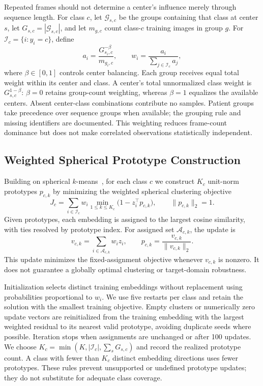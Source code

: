 Repeated frames should not determine a center's influence merely through sequence length. For class $c$, let $\mathcal{G}_{s,c}$ be the groups containing that class at center $s$, let $G_{s,c}=|\mathcal{G}_{s,c}|$, and let $m_{g,c}$ count class-$c$ training images in group $g$. For $\mathcal{I}_c=\{i:y_i=c\}$, define
\begin{equation}
    a_i=\frac{G_{s_i,c}^{-\beta}}{m_{g_i,c}},
    \qquad
    w_i=\frac{a_i}{\sum_{j\in\mathcal{I}_c}a_j},
    \label{eq:cbmp_weights}
\end{equation}
where $\beta\in[0,1]$ controls center balancing. Each group receives equal total weight within its center and class. A center's total unnormalized class weight is $G_{s,c}^{1-\beta}$: $\beta=0$ retains group-count weighting, whereas $\beta=1$ equalizes the available centers. Absent center-class combinations contribute no samples. Patient groups take precedence over sequence groups when available; the grouping rule and missing identifiers are documented. This weighting reduces frame-count dominance but does not make correlated observations statistically independent.

\subsection{Weighted Spherical Prototype Construction}
Building on spherical $k$-means~\cite{dhillon2001spherical}, for each class $c$ we construct $K_c$ unit-norm prototypes $p_{c,k}$ by minimizing the weighted spherical clustering objective
\begin{equation}
    J_c=\sum_{i\in\mathcal{I}_c}w_i
    \min_{1\leq k\leq K_c}\bigl(1-z_i^\top p_{c,k}\bigr),
    \qquad \|p_{c,k}\|_2=1.
    \label{eq:cbmp_clustering}
\end{equation}
Given prototypes, each embedding is assigned to the largest cosine similarity, with ties resolved by prototype index. For assigned set $\mathcal{A}_{c,k}$, the update is
\begin{equation}
    v_{c,k}=\sum_{i\in\mathcal{A}_{c,k}}w_i z_i,
    \qquad p_{c,k}=\frac{v_{c,k}}{\|v_{c,k}\|_2}.
    \label{eq:cbmp_update}
\end{equation}
This update minimizes the fixed-assignment objective whenever $v_{c,k}$ is nonzero. It does not guarantee a globally optimal clustering or target-domain robustness.

Initialization selects distinct training embeddings without replacement using probabilities proportional to $w_i$. We use five restarts per class and retain the solution with the smallest training objective. Empty clusters or numerically zero update vectors are reinitialized from the training embedding with the largest weighted residual to its nearest valid prototype, avoiding duplicate seeds where possible. Iteration stops when assignments are unchanged or after 100 updates. We choose $K_c=\min(K,|\mathcal{I}_c|,\sum_s G_{s,c})$ and record the realized prototype count. A class with fewer than $K_c$ distinct embedding directions uses fewer prototypes. These rules prevent unsupported or undefined prototype updates; they do not substitute for adequate class coverage.

